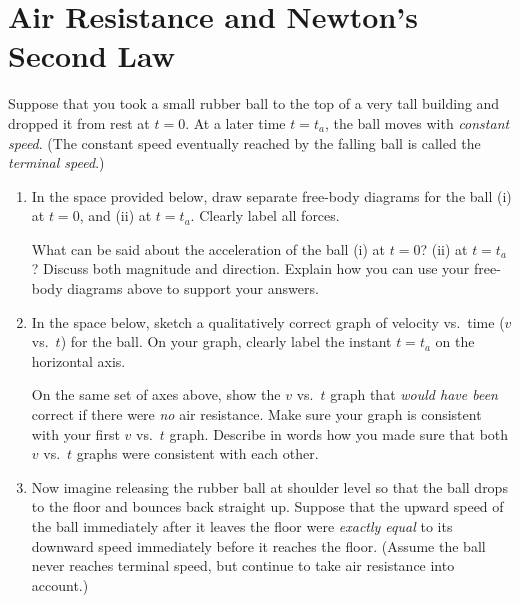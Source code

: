 \documentclass[12pt,hidelinks]{article}
\begin{document}
\section{Air Resistance and Newton's Second Law}
Suppose that you took a small rubber ball to the top of a very tall building and dropped it
from rest at $t=0$. At a later time $t=t_a$, the ball moves with \textit{constant speed}. (The
constant speed eventually reached by the falling ball is called the \textit{terminal speed}.)
\begin{enumerate}
  \item In the space provided below, draw separate free-body diagrams for the ball (i) at
  $t=0$, and (ii) at $t=t_a$.  Clearly label all forces. \vfill

  What can be said about the acceleration of the ball (i) at $t=0$? (ii) at $t=t_a$? Discuss
  both magnitude and direction.  Explain how you can use your free-body diagrams above to
  support your answers. \vfill
  \item In the space below, sketch a qualitatively correct graph of velocity vs.\ time ($v$
  vs.\ $t$) for the ball.  On your graph, clearly label the instant $t=t_a$ on the horizontal
  axis.
  \begin{center}
  \end{center}
  On the same set of axes above, show the $v$ vs.\ $t$ graph that \textit{would have been}
  correct if there were \textit{no} air resistance.  Make sure your graph is consistent with
  your first $v$ vs.\ $t$ graph.  Describe in words how you made sure that both $v$ vs.\ $t$
  graphs were consistent with each other. \vfill
  \newpage
  \item Now imagine releasing the rubber ball at shoulder level so that the ball drops to the
  floor and bounces back straight up. Suppose that the upward speed of the ball immediately
  after it leaves the floor were \textit{exactly equal} to its downward speed immediately
  before it reaches the floor.  (Assume the ball never reaches terminal speed, but continue to
  take air resistance into account.)
  \begin{center}
\end{center}
\end{enumerate}
\end{document}
